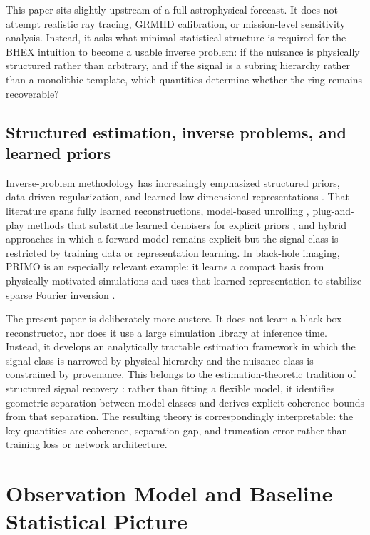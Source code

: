 \documentclass[11pt,a4paper]{article}
\theoremstyle{definition}
\theoremstyle{remark}
\begin{document}
This paper sits slightly upstream of a full astrophysical forecast. It does not attempt realistic ray tracing, GRMHD calibration, or mission-level sensitivity analysis. Instead, it asks what minimal statistical structure is required for the BHEX intuition to become a usable inverse problem: if the nuisance is physically structured rather than arbitrary, and if the signal is a subring hierarchy rather than a monolithic template, which quantities determine whether the ring remains recoverable?

\subsection{Structured estimation, inverse problems, and learned priors}

Inverse-problem methodology has increasingly emphasized structured priors, data-driven regularization, and learned low-dimensional representations \citep{Arridge2019Survey,Adler2018LPD,Ongie2020Survey}. That literature spans fully learned reconstructions, model-based unrolling \citep{Hammernik2018VN}, plug-and-play methods that substitute learned denoisers for explicit priors \citep{Chan2017PnP}, and hybrid approaches in which a forward model remains explicit but the signal class is restricted by training data or representation learning. In black-hole imaging, PRIMO is an especially relevant example: it learns a compact basis from physically motivated simulations and uses that learned representation to stabilize sparse Fourier inversion \citep{Medeiros2023PRIMO,Psaltis2024PRIMOTheory}.

The present paper is deliberately more austere. It does not learn a black-box reconstructor, nor does it use a large simulation library at inference time. Instead, it develops an analytically tractable estimation framework in which the signal class is narrowed by physical hierarchy and the nuisance class is constrained by provenance. This belongs to the estimation-theoretic tradition of structured signal recovery \citep{Candes2006Robust,Donoho2006CS,Candes2008RIP}: rather than fitting a flexible model, it identifies geometric separation between model classes and derives explicit coherence bounds from that separation. The resulting theory is correspondingly interpretable: the key quantities are coherence, separation gap, and truncation error rather than training loss or network architecture.

\section{Observation Model and Baseline Statistical Picture}
\end{document}
